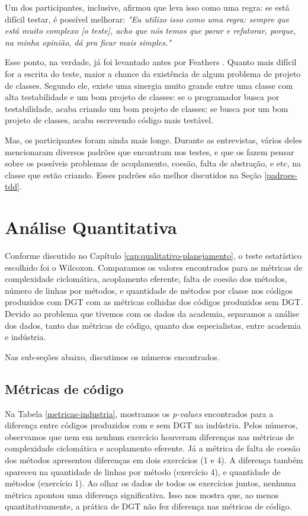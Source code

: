 Um dos participantes, inclusive, afirmou que leva isso como uma regra:
se está difícil testar, é possível melhorar:
\textit{"Eu utilizo isso como uma regra: sempre que está muito complexo [o teste],
acho que nós temos que parar e refatorar, porque, na minha opinião, dá
pra ficar mais simples."}

Esse ponto, na verdade, já foi levantado antes por Feathers \cite{feathers-synergy}.
Quanto mais difícil for a escrita do teste, maior a chance da existência de
algum problema de projeto de classes. Segundo ele, 
existe uma sinergia muito grande entre uma classe com alta testabilidade e um bom projeto de classes: 
se o programador busca por testabilidade, acaba criando um bom projeto de classes; se 
busca por um bom projeto de classes, acaba escrevendo código mais
testável.

Mas, os participantes foram ainda mais longe. Durante as entrevistas,
vários deles mencionaram diversos padrões que encontram nos testes,
e que os fazem pensar sobre os possíveis problemas de acoplamento,
coesão, falta de abstração, e etc, na classe que estão criando.
Esses padrões são melhor discutidos na Seção \ref{padroes-tdd}.

\section{Análise Quantitativa}

Conforme discutido no Capítulo \ref{cap:qualitativo-planejamento}, o teste
estatístico escolhido foi o Wilcoxon. Comparamos os valores encontrados
para as métricas de complexidade ciclomática, acoplamento eferente, falta
de coesão dos métodos, número de linhas por métodos, e quantidade de métodos
por classe nos códigos produzidos com DGT com as métricas colhidas dos
códigos produzidos sem DGT.
Devido ao problema que tivemos com os dados da academia, separamos a análise
dos dados, tanto das métricas de código, quanto dos especialistas, entre academia e indústria.

Nas sub-seções abaixo, discutimos os números encontrados.

\subsection{Métricas de código}

Na Tabela \ref{metricas-industria}, mostramos os \textit{p-values} encontrados para
a diferença entre códigos produzidos com e sem DGT na indústria. Pelos números, 
observamos que nem em nenhum exercício houveram diferenças nas métricas
de complexidade ciclomática e acoplamento eferente. Já a métrica de falta
de coesão dos métodos apresentou diferenças em dois exercícios (1 e 4). 
A diferença também apareceu na quantidade de linhas por método (exercício 4),
e quantidade de métodos (exercício 1). Ao olhar os dados de todos os exercícios
juntos, nenhuma métrica apontou uma diferença significativa.
Isso nos mostra que, ao menos quantitativamente, a prática de DGT não fez
diferença nas métricas de código.


